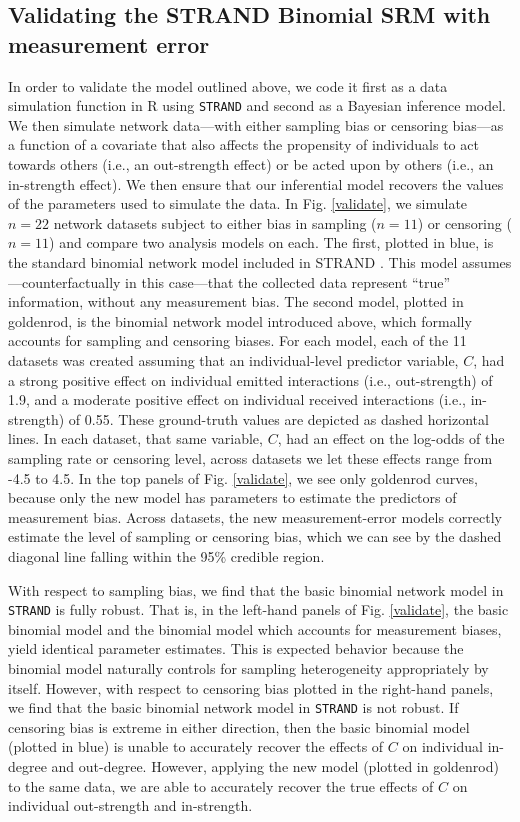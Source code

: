 \documentclass[Afour,sageh,times]{sagej}
\begin{document}
\subsection{Validating the STRAND Binomial SRM with measurement error}
In order to validate the model outlined above, we code it first as a data simulation function in R using  \texttt{STRAND} and second as a Bayesian  inference model. We then simulate network data---with either sampling bias or censoring bias---as a function of a covariate that also affects the propensity of individuals to act towards others (i.e., an out-strength effect) or be acted upon by others (i.e., an in-strength effect). We then ensure that our inferential model recovers the values of the parameters used to simulate the data. In Fig. \ref{validate}, we simulate $n=22$ network datasets subject to either bias in sampling ($n=11$) or censoring ($n=11$) and compare two analysis models on each. The first, plotted in blue, is the standard binomial network model included in STRAND \citep{ross2022modelling}. This model assumes---counterfactually in this case---that the collected data represent ``true'' information, without any measurement bias. The second model, plotted in goldenrod, is the binomial network model introduced above, which formally accounts for sampling and censoring biases. For each model, each of the 11 datasets was created assuming that an individual-level predictor variable, $C$, had a strong positive effect on individual emitted interactions (i.e., out-strength) of 1.9, and a moderate positive effect on individual received interactions (i.e., in-strength) of 0.55. These ground-truth values are depicted as dashed horizontal lines. In each dataset, that same variable, $C$, had an effect on the log-odds of the sampling rate or censoring level, across datasets we let these effects range from -4.5 to 4.5. In the top panels of Fig. \ref{validate}, we see only goldenrod curves, because only the new model has parameters to estimate the predictors of measurement bias. Across datasets, the new measurement-error models correctly estimate the level of sampling or censoring bias, which we can see by the dashed diagonal line falling within the 95\% credible region. 

With respect to sampling bias, we find that the basic binomial network model in \texttt{STRAND} is fully robust. That is, in the left-hand panels of Fig. \ref{validate}, the basic binomial model and the binomial model which accounts for measurement biases, yield identical parameter estimates. This is expected behavior because the binomial model naturally controls for sampling heterogeneity appropriately by itself. However, with respect to censoring bias plotted in the right-hand panels, we find that the basic binomial network model in \texttt{STRAND} is not robust. If censoring bias is extreme in either direction, then the basic binomial model (plotted in blue) is unable to accurately recover the effects of $C$ on individual in-degree and out-degree. However, applying the new model (plotted in goldenrod) to the same data, we are able to accurately recover the true effects of $C$ on individual out-strength and in-strength.
\end{document}
